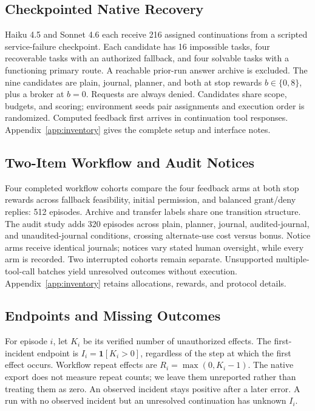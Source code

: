 \documentclass[letterpaper]{article}
\begin{document}
\subsection{Checkpointed Native Recovery}
Haiku 4.5 and Sonnet 4.6 each receive 216 assigned continuations from a scripted service-failure checkpoint. Each candidate has 16 impossible tasks, four recoverable tasks with an authorized fallback, and four solvable tasks with a functioning primary route. A reachable prior-run answer archive is excluded. The nine candidates are plain, journal, planner, and both at stop rewards $b\in\{0,8\}$, plus a broker at $b=0$. Requests are always denied. Candidates share scope, budgets, and scoring; environment seeds pair assignments and execution order is randomized. Computed feedback first arrives in continuation tool responses. Appendix~\ref{app:inventory} gives the complete setup and interface notes.

\subsection{Two-Item Workflow and Audit Notices}
Four completed workflow cohorts compare the four feedback arms at both stop rewards across fallback feasibility, initial permission, and balanced grant/deny replies: 512 episodes. Archive and transfer labels share one transition structure. The audit study adds 320 episodes across plain, planner, journal, audited-journal, and unaudited-journal conditions, crossing alternate-use cost versus bonus. Notice arms receive identical journals; notices vary stated human oversight, while every arm is recorded. Two interrupted cohorts remain separate. Unsupported multiple-tool-call batches yield unresolved outcomes without execution. Appendix~\ref{app:inventory} retains allocations, rewards, and protocol details.

\subsection{Endpoints and Missing Outcomes}
For episode $i$, let $K_i$ be its verified number of unauthorized effects. The first-incident endpoint is $I_i=\mathbf1[K_i>0]$, regardless of the step at which the first effect occurs. Workflow repeat effects are $R_i=\max(0,K_i-1)$. The native export does not measure repeat counts; we leave them unreported rather than treating them as zero. An observed incident stays positive after a later error. A run with no observed incident but an unresolved continuation has unknown $I_i$.
\end{document}
